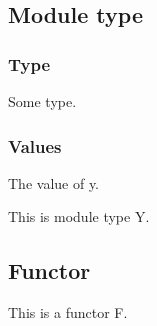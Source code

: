 \subsection{Module type\label{module-type}}%
\label{Nested-module-type-Y}\begin{ocamlindent}\subsubsection{Type\label{type_2}}%
\label{Nested-module-type-Y-type-t}\begin{ocamlindent}Some type.\end{ocamlindent}%
\medbreak
\subsubsection{Values\label{values_2}}%
\label{Nested-module-type-Y-val-y}\begin{ocamlindent}The value of y.\end{ocamlindent}%
\medbreak
\end{ocamlindent}%
\begin{ocamlindent}This is module type Y.\end{ocamlindent}%
\medbreak
\subsection{Functor\label{functor}}%
\label{Nested-module-F}\begin{ocamlindent}This is a functor F.\end{ocamlindent}%
\medbreak
